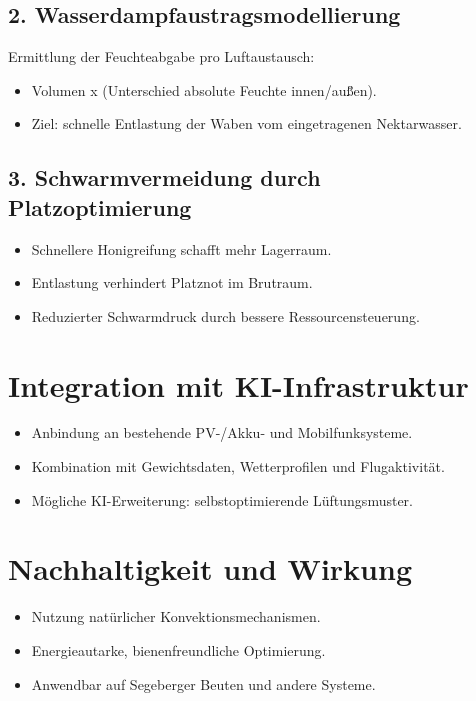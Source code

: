 \documentclass[11pt,a4paper]{article}
\begin{document}
\subsection{2. Wasserdampfaustragsmodellierung}
Ermittlung der Feuchteabgabe pro Luftaustausch:
\begin{itemize}[topsep=2pt]
  \item Volumen x (Unterschied absolute Feuchte innen/au\u{\ss}en).
  \item Ziel: schnelle Entlastung der Waben vom eingetragenen Nektarwasser.
\end{itemize}

\subsection{3. Schwarmvermeidung durch Platzoptimierung}
\begin{itemize}[topsep=2pt]
  \item Schnellere Honigreifung schafft mehr Lagerraum.
  \item Entlastung verhindert Platznot im Brutraum.
  \item Reduzierter Schwarmdruck durch bessere Ressourcensteuerung.
\end{itemize}

\section{Integration mit KI-Infrastruktur}
\begin{itemize}[topsep=2pt]
  \item Anbindung an bestehende PV-/Akku- und Mobilfunksysteme.
  \item Kombination mit Gewichtsdaten, Wetterprofilen und Flugaktivit\"at.
  \item M\"ogliche KI-Erweiterung: selbstoptimierende L\"uftungsmuster.
\end{itemize}

\section{Nachhaltigkeit und Wirkung}
\begin{itemize}[topsep=2pt]
  \item Nutzung nat\"urlicher Konvektionsmechanismen.
  \item Energieautarke, bienenfreundliche Optimierung.
  \item Anwendbar auf Segeberger Beuten und andere Systeme.
\end{itemize}
\end{document}
